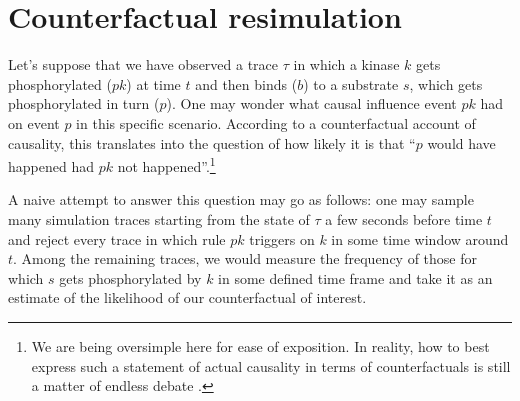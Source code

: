 
\section{Counterfactual resimulation}\label{sec:counterfactual}














Let's suppose that we have observed a trace $\tau$ in which a kinase
$k$ gets phosphorylated ($pk$) at time $t$ and then binds ($b$) to a
substrate $s$, which gets phosphorylated in turn ($p$). One may wonder
what causal influence event $pk$ had on event $p$ in this specific
scenario. According to a counterfactual account of causality,
this translates into the question of how likely it is that {``$p$
  would have happened had $pk$ not happened''}.\footnote{We
  are being oversimple here for ease of exposition. In
  reality, how to best express such a statement of actual causality in
  terms of counterfactuals is still a matter of endless debate
  \cite{halpern2016actual}. }

A naive attempt to answer this question may go as follows: one may
sample many simulation traces starting from the state of $\tau$ a few
seconds before time $t$ and reject every trace in which rule $pk$
triggers on $k$ in some time window around $t$.  Among the remaining
traces, we would measure the frequency of those for which $s$ gets
phosphorylated by $k$ in some defined time frame and take it as an
estimate of the likelihood of our counterfactual of interest.


